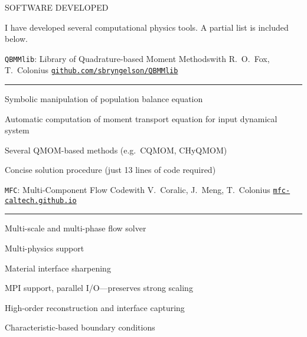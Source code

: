 \documentclass{resume} %
\begin{document}
\newpage
\begin{rSection}{{\Large S}OFTWARE DEVELOPED}

I have developed several computational physics tools.
A partial list is included below.

\begin{rSubsections}{\texttt{QBMMlib}: Library of Quadrature-based Moment Methods}{}{with R.\ O.\ Fox, T.\ Colonius}{}
\hfill\href{https://github.com/sbryngelson/QBMMlib}{\texttt{github.com/sbryngelson/QBMMlib}}
\vspace{-0.65cm}
\par\noindent\rule{0.97\textwidth}{0.4pt}

    \begin{minipage}{0.99\linewidth}
	\begin{list}{\textbullet}{\leftmargin=2.5em} 
     	\item Symbolic manipulation of population balance equation
        \item Automatic computation of moment transport equation for input dynamical system
        \item Several QMOM-based methods (e.g.\ CQMOM, CHyQMOM)
        \item Concise solution procedure (just 13 lines of code required)
  	\end{list}
    \end{minipage}
\end{rSubsections}



\medskip
\begin{rSubsections}{\texttt{MFC}: Multi-Component Flow Code}{}{with V.\ Coralic, J.\ Meng, T.\ Colonius}{}
\hfill\href{https://mfc-caltech.github.io/}{\texttt{mfc-caltech.github.io}}
\vspace{-0.65cm}
\par\noindent\rule{0.97\textwidth}{0.4pt}

    \begin{minipage}{0.45\linewidth}
	\begin{list}{\textbullet}{\leftmargin=2.5em} 
     	\item Multi-scale and multi-phase flow solver 
        \item Multi-physics support
        \item Material interface sharpening
  	\end{list}
    \end{minipage}
    \hspace{-0.5cm}
    \begin{minipage}{0.65\linewidth}
	\begin{list}{\textbullet}{\leftmargin=2.5em} 
        \item MPI support, parallel I/O---preserves strong scaling
        \item High-order reconstruction and interface capturing
        \item Characteristic-based boundary conditions
  	\end{list}
    \end{minipage}
\end{rSubsections}
\medskip


\end{rSection}
\end{document}
